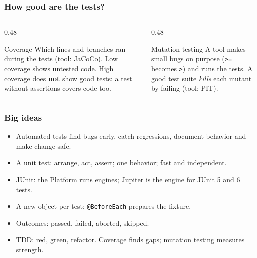 \documentclass[aspectratio=169,10pt,compress]{beamer}
\begin{document}
\begin{frame}[t,fragile] \frametitle{How good are the tests?}
  \begin{columns}[T]
    \begin{column}{0.48\textwidth}
      \begin{block}{Coverage}
        \small Which lines and branches ran during the tests (tool: JaCoCo).
        Low coverage shows untested code. High coverage does \textbf{not} show good tests: a test without
        assertions covers code too.
      \end{block}
    \end{column}
    \begin{column}{0.48\textwidth}
      \begin{block}{Mutation testing}
        \small A tool makes small bugs on purpose (\texttt{>=} becomes \texttt{>}) and runs the tests.
        A good test suite \emph{kills} each mutant by failing (tool: PIT).
      \end{block}
    \end{column}
  \end{columns}
\end{frame}





\begin{frame}[t,fragile] \frametitle{Big ideas}
  \begin{itemize}
    \item Automated tests find bugs early, catch regressions, document behavior and make change safe.
    \item A unit test: arrange, act, assert; one behavior; fast and independent.
    \item JUnit: the Platform runs engines; Jupiter is the engine for JUnit 5 and 6 tests.
    \item A new object per test; \texttt{@BeforeEach} prepares the fixture.
    \item Outcomes: passed, failed, aborted, skipped.
    \item TDD: red, green, refactor. Coverage finds gaps; mutation testing measures strength.
  \end{itemize}
\end{frame}
\end{document}
